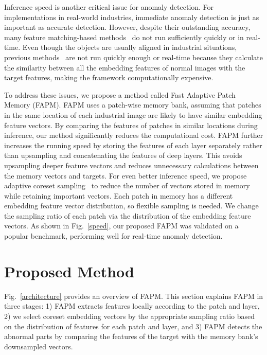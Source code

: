 \documentclass{article}
\begin{document}
   
    Inference speed is another critical issue for anomaly detection. For implementations in real-world industries, immediate anomaly detection is just as important as accurate detection. However, despite their outstanding accuracy, many feature matching-based methods~\cite{Padim,patchcore,SPADE} do not run sufficiently quickly or in real-time. Even though the objects are usually aligned in industrial situations, previous methods~\cite{patchcore,SPADE} are not run quickly enough or real-time because they calculate the similarity between all the embedding features of normal images with the target features, making the framework computationally expensive.

    
    To address these issues, we propose a method called Fast Adaptive Patch Memory (FAPM). FAPM uses a patch-wise memory bank, assuming that patches in the same location of each industrial image are likely to have similar embedding feature vectors. By comparing the features of patches in similar locations during inference, our method significantly reduces the computational cost. FAPM further increases the running speed by storing the features of each layer separately rather than upsampling and concatenating the features of deep layers. This avoids upsampling deeper feature vectors and reduces unnecessary calculations between the memory vectors and targets. For even better inference speed, we propose adaptive coreset sampling~\cite{core} to reduce the number of vectors stored in memory while retaining important vectors. Each patch in memory has a different embedding feature vector distribution, so flexible sampling is needed. We change the sampling ratio of each patch via the distribution of the embedding feature vectors. As shown in Fig.~\ref{speed}, our proposed FAPM was validated on a popular benchmark, performing well for real-time anomaly detection.
 
\vspace{-0.4cm}
	\section{Proposed Method}
 \vspace{-0.3cm}
 Fig.~\ref{architecture} provides an overview of FAPM. This section explains FAPM in three stages: 1) FAPM extracts features locally according to the patch and layer, 2) we select coreset embedding vectors by the appropriate sampling ratio based on the distribution of features for each patch and layer, and 3) FAPM detects the abnormal parts by comparing the features of the target with the memory bank’s downsampled vectors.
\end{document}
